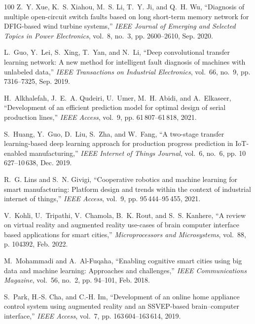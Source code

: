 \documentclass[journal]{IEEEtran}
\begin{document}
\begin{thebibliography}{100}
	Z.~Y. Xue, K.~S. Xiahou, M.~S. Li, T.~Y. Ji, and Q.~H. Wu, ``Diagnosis of
	multiple open-circuit switch faults based on long short-term memory network
	for {DFIG}-based wind turbine systems,'' \emph{IEEE Journal of Emerging and
		Selected Topics in Power Electronics}, vol.~8, no.~3, pp. 2600--2610, Sep.
	2020.
	
	L.~Guo, Y.~Lei, S.~Xing, T.~Yan, and N.~Li, ``Deep convolutional transfer
	learning network: A new method for intelligent fault diagnosis of machines
	with unlabeled data,'' \emph{IEEE Transactions on Industrial Electronics},
	vol.~66, no.~9, pp. 7316--7325, Sep. 2019.
	
	H.~Alkhalefah, J.~E.~A. Qudeiri, U.~Umer, M.~H. Abidi, and A.~Elkaseer,
	``Development of an efficient prediction model for optimal design of serial
	production lines,'' \emph{IEEE Access}, vol.~9, pp. 61\,807--61\,818, 2021.
	
	S.~Huang, Y.~Guo, D.~Liu, S.~Zha, and W.~Fang, ``A two-stage transfer
	learning-based deep learning approach for production progress prediction in
	{IoT}-enabled manufacturing,'' \emph{IEEE Internet of Things Journal},
	vol.~6, no.~6, pp. 10\,627--10\,638, Dec. 2019.
	
	R.~G. Lins and S.~N. Givigi, ``Cooperative robotics and machine learning for
	smart manufacturing: Platform design and trends within the context of
	industrial internet of things,'' \emph{IEEE Access}, vol.~9, pp.
	95\,444--95\,455, 2021.
	
	V.~Kohli, U.~Tripathi, V.~Chamola, B.~K. Rout, and S.~S. Kanhere, ``A review on
	virtual reality and augmented reality use-cases of brain computer interface
	based applications for smart cities,'' \emph{Microprocessors and
		Microsystems}, vol.~88, p. 104392, Feb. 2022.
	
	M.~Mohammadi and A.~Al-Fuqaha, ``Enabling cognitive smart cities using big data
	and machine learning: Approaches and challenges,'' \emph{IEEE Communications
		Magazine}, vol.~56, no.~2, pp. 94--101, Feb. 2018.
	
	S.~Park, H.-S. Cha, and C.-H. Im, ``Development of an online home appliance
	control system using augmented reality and an {SSVEP}-based brain–computer
	interface,'' \emph{IEEE Access}, vol.~7, pp. 163\,604--163\,614, 2019.
	

\end{thebibliography}
\end{document}

